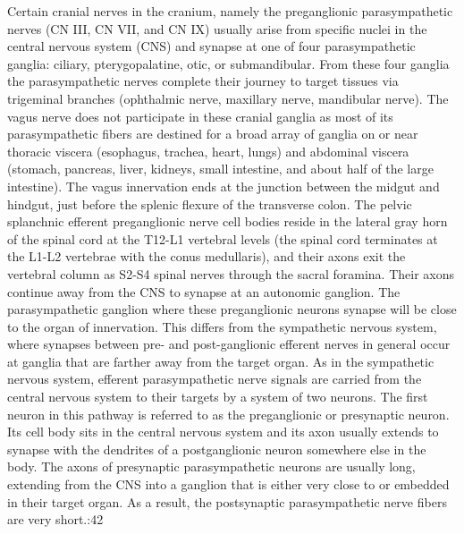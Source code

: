Certain cranial nerves in the cranium, namely the preganglionic parasympathetic nerves (CN III, CN VII, and CN IX) usually arise from specific nuclei in the central nervous system (CNS) and synapse at one of four parasympathetic ganglia: ciliary, pterygopalatine, otic, or submandibular. From these four ganglia the parasympathetic nerves complete their journey to target tissues via trigeminal branches (ophthalmic nerve, maxillary nerve, mandibular nerve).
The vagus nerve does not participate in these cranial ganglia as most of its parasympathetic fibers are destined for a broad array of ganglia on or near thoracic viscera (esophagus, trachea, heart, lungs) and abdominal viscera (stomach, pancreas, liver, kidneys, small intestine, and about half of the large intestine). The vagus innervation ends at the junction between the midgut and hindgut, just before the splenic flexure of the transverse colon.
The pelvic splanchnic efferent preganglionic nerve cell bodies reside in the lateral gray horn of the spinal cord at the T12-L1 vertebral levels (the spinal cord terminates at the L1-L2 vertebrae with the conus medullaris), and their axons exit the vertebral column as S2-S4 spinal nerves through the sacral foramina. Their axons continue away from the CNS to synapse at an autonomic ganglion. The parasympathetic ganglion where these preganglionic neurons synapse will be close to the organ of innervation. This differs from the sympathetic nervous system, where synapses between pre- and post-ganglionic efferent nerves in general occur at ganglia that are farther away from the target organ.
As in the sympathetic nervous system, efferent parasympathetic nerve signals are carried from the central nervous system to their targets by a system of two neurons. The first neuron in this pathway is referred to as the preganglionic or presynaptic neuron. Its cell body sits in the central nervous system and its axon usually extends to synapse with the dendrites of a postganglionic neuron somewhere else in the body. The axons of presynaptic parasympathetic neurons are usually long, extending from the CNS into a ganglion that is either very close to or embedded in their target organ. As a result, the postsynaptic parasympathetic nerve fibers are very short.:42

